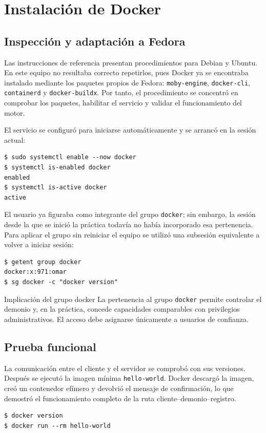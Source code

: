 \section{Instalación de Docker}

\subsection{Inspección y adaptación a Fedora}

Las instrucciones de referencia presentan procedimientos para Debian y
Ubuntu. En este equipo no resultaba correcto repetirlos, pues Docker ya se
encontraba instalado mediante los paquetes propios de Fedora:
\texttt{moby-engine}, \texttt{docker-cli}, \texttt{containerd} y
\texttt{docker-buildx}. Por tanto, el procedimiento se concentró en comprobar
los paquetes, habilitar el servicio y validar el funcionamiento del motor.

El servicio se configuró para iniciarse automáticamente y se arrancó en la
sesión actual:

\begin{lstlisting}[style=terminal]
$ sudo systemctl enable --now docker
$ systemctl is-enabled docker
enabled
$ systemctl is-active docker
active
\end{lstlisting}

El usuario ya figuraba como integrante del grupo \texttt{docker}; sin embargo,
la sesión desde la que se inició la práctica todavía no había incorporado esa
pertenencia. Para aplicar el grupo sin reiniciar el equipo se utilizó una
subsesión equivalente a volver a iniciar sesión:

\begin{lstlisting}[style=terminal]
$ getent group docker
docker:x:971:omar
$ sg docker -c "docker version"
\end{lstlisting}

\begin{nota}{Implicación del grupo docker}
La pertenencia al grupo \texttt{docker} permite controlar el demonio y, en la
práctica, concede capacidades comparables con privilegios administrativos. El
acceso debe asignarse únicamente a usuarios de confianza.
\end{nota}

\subsection{Prueba funcional}

La comunicación entre el cliente y el servidor se comprobó con sus versiones.
Después se ejecutó la imagen mínima \texttt{hello-world}. Docker descargó la
imagen, creó un contenedor efímero y devolvió el mensaje de confirmación, lo que
demostró el funcionamiento completo de la ruta cliente--demonio--registro.

\begin{lstlisting}[style=terminal]
$ docker version
$ docker run --rm hello-world
\end{lstlisting}

